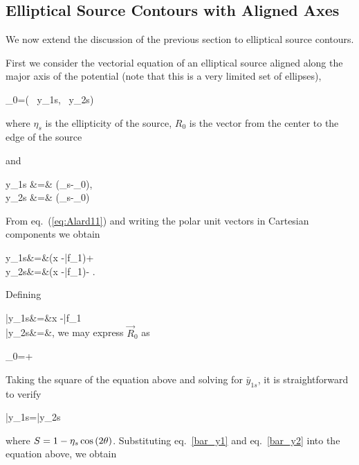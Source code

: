 \subsection{Elliptical Source Contours with Aligned Axes}

We now extend the discussion of the previous section to elliptical
source contours.

First we consider the vectorial equation of an elliptical source
aligned along the major axis of the potential (note that this is a
very limited set of ellipses),

\beq
\label{eq:ellipse}
_0=\left( \, y_{1s}, \, y_{2s}\right)
\eeq

where $\eta_s$ is the ellipticity of the source, $R_0$ is the vector from the
center to the edge of the source

and
 
\bea
y_{1s} &=& (_s-_0)\cdot{}, \\
y_{2s} &=& (_s-_0)\cdot{}
\eea

From eq.~(\ref{eq:Alard11}) and writing the polar unit vectors in Cartesian
components we obtain

\bea
y_{1s}&=&(\kt x -\bar{f}_1)\cos{\te}+\sin{\te} \label{y_1s}\\
y_{2s}&=&(\kt x -\bar{f}_1)\sin{\te}-\cos{\te} \label{y_2s}.
\eea

Defining

\bea
\bar{y}_{1s}&=&\kt x -\bar{f}_1\label{bar_y1}\\
\bar{y}_{2s}&=&,\label{bar_y2}
\eea
we may express $\vec{R}_0$ as

\beq
{}_0=\hat{\imath}+\hat{\jmath}
\eeq

Taking the square of the equation above and solving for $\bar{y}_{1s}$, it is
straightforward to verify

\beq
\bar{y}_{1s}=\bar{y}_{2s}\pm {}
\eeq

where $S=1-\eta_s\cos{(2\theta)}$. Substituting eq.~\eqref{bar_y1} and
eq.~\eqref{bar_y2} into the equation above, we obtain

